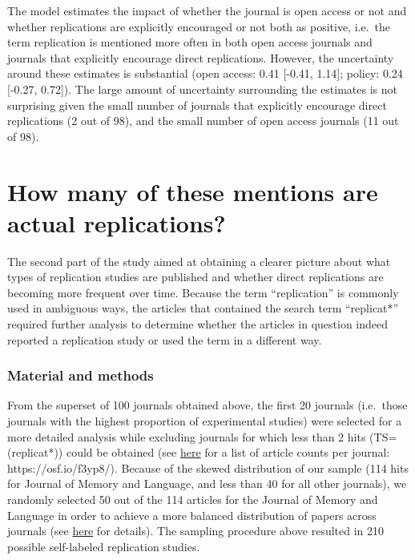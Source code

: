 \documentclass[]{elsarticle} %
\begin{document}
The model estimates the impact of whether the journal is open access or
not and whether replications are explicitly encouraged or not both as
positive, i.e.~the term replication is mentioned more often in both open
access journals and journals that explicitly encourage direct
replications. However, the uncertainty around these estimates is
substantial (open access: 0.41 {[}-0.41, 1.14{]}; policy: 0.24 {[}-0.27,
0.72{]}). The large amount of uncertainty surrounding the estimates is
not surprising given the small number of journals that explicitly
encourage direct replications (2 out of 98), and the small number of
open access journals (11 out of 98).

\hypertarget{how-many-of-these-mentions-are-actual-replications}{%
\section{How many of these mentions are actual
replications?}\label{how-many-of-these-mentions-are-actual-replications}}

The second part of the study aimed at obtaining a clearer picture about
what types of replication studies are published and whether direct
replications are becoming more frequent over time. Because the term
``replication'' is commonly used in ambiguous ways, the articles that
contained the search term ``replicat*'' required further analysis to
determine whether the articles in question indeed reported a replication
study or used the term in a different way.

\hypertarget{material-and-methods-1}{%
\subsubsection{Material and methods}\label{material-and-methods-1}}

From the superset of 100 journals obtained above, the first 20 journals
(i.e.~those journals with the highest proportion of experimental
studies) were selected for a more detailed analysis while excluding
journals for which less than 2 hits (TS=(replicat*)) could be obtained
(see \href{https://osf.io/f3yp8/}{here} for a list of article counts per
journal: https://osf.io/f3yp8/). Because of the skewed distribution of
our sample (114 hits for Journal of Memory and Language, and less than
40 for all other journals), we randomly selected 50 out of the 114
articles for the Journal of Memory and Language in order to achieve a
more balanced distribution of papers across journals (see
\href{https://osf.io/6vfpe/}{here} for details). The sampling procedure
above resulted in 210 possible self-labeled replication studies.
\end{document}
